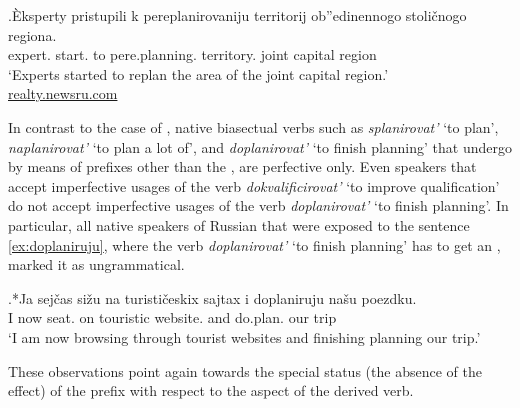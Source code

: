 \exg.\label{ex:pereplanirovanie}\`{E}ksperty pristupili k pereplanirovaniju territorij ob''edinennogo stoli\v{c}nogo regiona.\\
expert. start. to pere.planning. territory. joint capital region\\
\trans `Experts started to replan the area of the joint capital region.'\\\hbox{}\hfill\hbox{\url{realty.newsru.com}}

In contrast to the case of  , native biasectual verbs such as \textit{splanirovat'} `to plan', \textit{naplanirovat'} `to plan a lot of', and \textit{doplanirovat'} `to finish planning' that undergo  by means of prefixes other than the  , are perfective only. Even speakers that accept imperfective usages of the verb \textit{dokvalificirovat'} `to improve qualification' do not accept imperfective usages of the verb \textit{doplanirovat'} `to finish planning'. In particular, all native speakers of Russian that were exposed to the sentence \ref{ex:doplaniruju}, where the verb \textit{doplanirovat'} `to finish planning' has to get an , marked it as ungrammatical.

\exg.*Ja sej\v{c}as si\v{z}u na turisti\v{c}eskix sajtax i doplaniruju na\v{s}u poezdku.\label{ex:doplaniruju}\\
I now seat. on touristic website. and do.plan. our trip\\
\trans `I am now browsing through tourist websites and finishing planning our trip.'\largerpage

These observations point again towards the special status (the absence of the  effect) of the prefix  with respect to the aspect of the derived verb.

